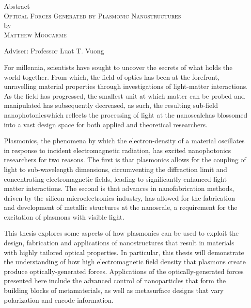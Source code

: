 \begin{center}
Abstract \\
\textsc{Optical Forces Generated by Plasmonic Nanostructures} \\
by \\
\textsc{Matthew Moocarme} \\[0.25in]
\end{center}

\vspace{0.25in}
\noindent Adviser: Professor Luat T. Vuong
\vspace{0.25in}
\noindent 

For millennia, scientists have sought to uncover the secrets of what holds the world together. From which, the field of optics has been at the forefront, unravelling material properties through investigations of light-matter interactions. As the field has progressed, the smallest unit at which matter can be probed and manipulated has subsequently decreased, as such, the resulting sub-field nanophotonics\textemdash  which reflects the processing of light at the nanoscale\textemdash has blossomed into a vast design space for both applied and theoretical researchers.

Plasmonics, the phenomena by which the electron-density of a material oscillates in response to incident electromagnetic radiation, has excited nanophotonics researchers for two reasons. The first is that plasmonics allows for the coupling of light to sub-wavelength dimensions, circumventing the diffraction limit and concentrating electromagnetic fields, leading to significantly enhanced light-matter interactions. The second is that advances in nanofabrication methods, driven by the silicon microelectronics industry, has allowed for the fabrication and development of metallic structures at the nanoscale, a requirement for the excitation of plasmons with visible light.

This thesis explores some aspects of how plasmonics can be used to exploit the design, fabrication and applications of nanostructures that result in materials with highly tailored optical properties. In particular, this thesis will demonstrate the understanding of how high electromagnetic field density that plasmons create produce optically-generated forces. Applications of the optically-generated forces presented here include the advanced control of nanoparticles that form the building blocks of metamaterials, as well as metasurface designs that vary polarization and encode information. 

